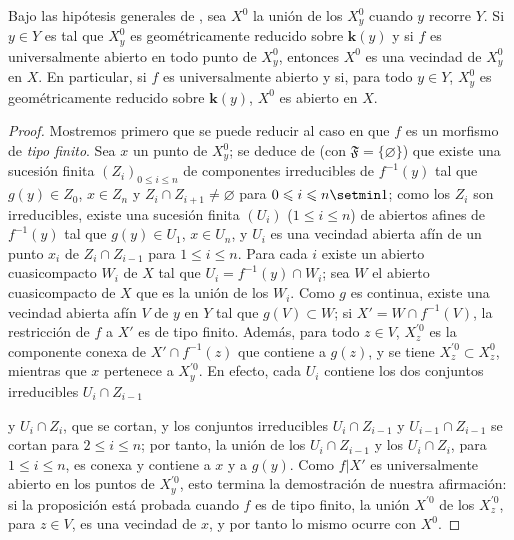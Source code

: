 \begin{proposition}[15.6.4]
\label{IV.15.6.4}
Bajo las hipótesis generales de , sea $X^0$ la unión de los $X_y^0$ cuando $y$ recorre $Y$.
Si $y\in Y$ es tal que $X_y^0$ es geométricamente reducido sobre $\boldsymbol{k}(y)$  y si $f$ es universalmente abierto en todo punto de $X_y^0$, entonces $X^0$ es una vecindad de $X_y^0$ en $X$.
En particular, si $f$ es universalmente abierto y si, para todo $y\in Y$, $X_y^0$ es geométricamente reducido sobre $\boldsymbol{k}(y)$, $X^0$ es abierto en $X$.
\end{proposition}

\begin{proof}
Mostremos primero que se puede reducir al caso en que $f$ es un morfismo de \emph{tipo finito}.
Sea $x$ un punto de $X_y^0$; se deduce de  (con $\mathfrak F=\{\varnothing\}$) que existe una sucesión finita $(Z_i)_{0\leqslant i\leqslant n}$ de componentes irreducibles de $f^{-1}(y)$ tal que $g(y)\in Z_0$, $x\in Z_n$ y $Z_i\cap Z_{i+1}\ne\varnothing$ para $0\leqslant i\leqslant n\setmin 1$; como los $Z_i$ son irreducibles, existe una sucesión finita $(U_i)$ ($1\leqslant i\leqslant n$) de abiertos afines de $f^{-1}(y)$ tal que $g(y)\in U_1$, $x\in U_n$, y $U_i$ es una vecindad abierta afín de un punto $x_i$ de $Z_i\cap Z_{i-1}$ para $1\leqslant i\leqslant n$.
Para cada $i$ existe un abierto cuasicompacto $W_i$ de $X$ tal que $U_i=f^{-1}(y)\cap W_i$; sea $W$ el abierto cuasicompacto de $X$ que es la unión de los $W_i$.
Como $g$ es continua, existe una vecindad abierta afín $V$ de $y$ en $Y$ tal que $g(V)\subset W$; si $X'=W\cap f^{-1}(V)$, la restricción de $f$ a $X'$ es de tipo finito. Además, para todo $z\in V$, $X_z^{\prime 0}$ es la componente conexa de $X'\cap f^{-1}(z)$ que contiene a $g(z)$, y se tiene $X_z^{\prime 0}\subset X_z^0$, mientras que $x$ pertenece a $X_y^{\prime 0}$.
En efecto, cada $U_i$ contiene los dos conjuntos irreducibles $U_i\cap Z_{i-1}$

y $U_i\cap Z_i$, que se cortan, y los conjuntos irreducibles $U_i\cap Z_{i-1}$ y $U_{i-1}\cap Z_{i-1}$ 
se cortan para $2\leqslant i\leqslant n$; por tanto, la unión de los $U_i\cap Z_{i-1}$ y los $U_i\cap Z_i$, para $1\leqslant i\leqslant n$, es conexa y contiene a $x$ y a $g(y)$.
Como $f|X'$ es universalmente abierto en los puntos de $X_y^{\prime 0}$, esto termina la demostración de nuestra afirmación: si la proposición está probada cuando $f$ es de tipo finito, la unión $X^{\prime 0}$ de los $X_z^{\prime 0}$, para $z\in V$, es una vecindad de $x$, y por tanto lo mismo ocurre con $X^0$.


\end{proof}
